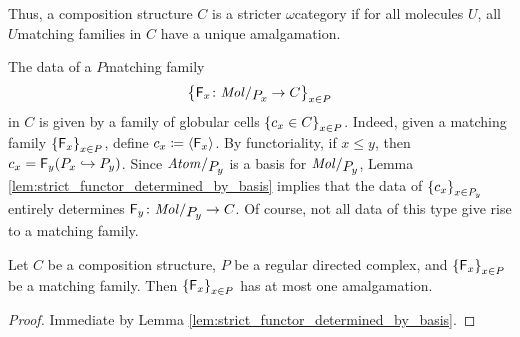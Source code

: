 \begin{rmk}
    Thus, a composition structure \( C \) is a stricter \( \omega \)\nbd category if for all molecules \( U \), all \( U \)\nbd matching families in \( C \) have a unique amalgamation.
\end{rmk}

\begin{rmk}\label{rmk:data_matching family}
    The data of a \( P \)\nbd matching family 
    \begin{equation*}
        \set{\F_x \colon \molecin{\imel{P}{x}} \to C}_{x \in P}
    \end{equation*}
    in \( C \) is given by a family of globular cells \( \left\{ {c_x \in C} \right\}_{x \in P} \).
    Indeed, given a matching family \( \left\{ {\mathsf{F}_x} \right\}_{x \in P} \), define \( c_x \coloneqq \langle\mathsf{F}_x\rangle \).
    By functoriality, if \( x \le y \), then \( c_x = \mathsf{F}_y({P}_{x} \hookrightarrow {P}_{y}) \).
    Since \( \atomin{\imel{P}{y}} \) is a basis for \( \molecin{\imel{P}{y}} \), Lemma \ref{lem:strict_functor_determined_by_basis} implies that the data of \( \left\{ {c_x} \right\}_{x \in {P}_{y}} \) entirely determines \( \F_y \colon \molecin{\imel{P}{y}} \to C \).
    Of course, not all data of this type give rise to a matching family. 
\end{rmk}

\begin{lem}\label{lem:at_most_one_lift}
    Let \( C \) be a composition structure, \( P \) be a regular directed complex, and \( \left\{ {\mathsf{F}_x} \right\}_{x \in P} \) be a matching family. 
    Then \( \left\{ {\mathsf{F}_x} \right\}_{x \in P} \) has at most one amalgamation.
\end{lem}
\begin{proof}
    Immediate by Lemma \ref{lem:strict_functor_determined_by_basis}.
\end{proof}

